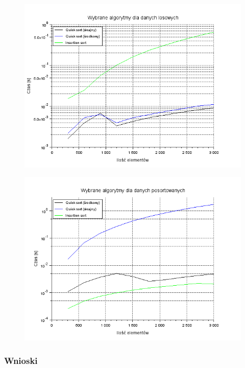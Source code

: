 \documentclass{article}
\begin{document}
\begin{figure}[h]
\centering
\begin{minipage}{.5\textwidth}
  \centering
  \includegraphics[width=1\linewidth]{losowe}
  \label{fig:losowe}
\end{minipage}%
\begin{minipage}{.5\textwidth}
  \centering
				\includegraphics[width=1\linewidth]{posortowane}
  \label{fig:rozklad_rosnacy}
\end{minipage}
\end{figure}

\subsubsection{Wnioski}
\end{document}
